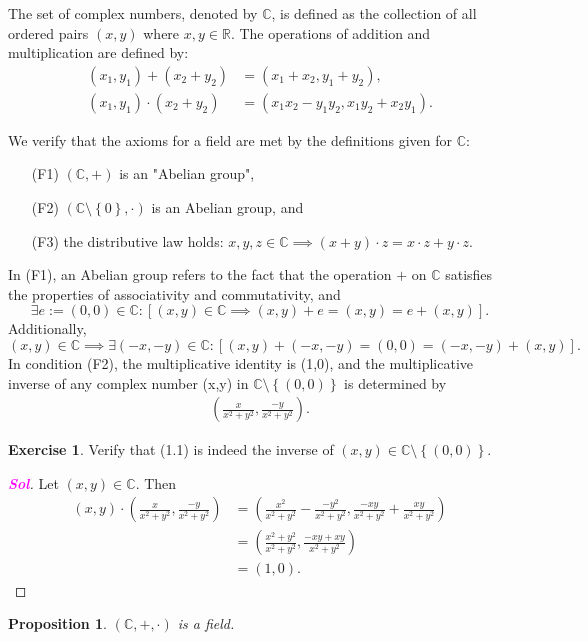 \documentclass[12pt,openany]{book}
\newtheorem{proposition}[theorem]{Proposition}
\theoremstyle{definition}
\newtheorem{exercise}{Exercise}[section]
\newcommand{\set}[1]{\left\{#1\right\}}
\newcommand{\R}{\mathbb{R}}
\newcommand{\C}{\mathbb{C}}
\newcommand{\of}[1]{\left( #1 \right)}
\newcommand{\sol}{\textcolor{magenta}{\bf Sol}}
\begin{document}
	The set of complex numbers, denoted by $\C$, is defined as the collection of all ordered pairs $(x,y)$ where $x,y\in\R$. The operations of addition and multiplication are defined by:\begin{align*}
		(x_1,y_1)+(x_2+y_2)&=(x_1+x_2,y_1+y_2),\\
		(x_1,y_1)\cdot(x_2+y_2)&=(x_1x_2-y_1y_2,x_1y_2+x_2y_1).
	\end{align*}
	
	We verify that the axioms for a field are met by the definitions given for $\C$: \begin{itemize}
		\item[(F1)] $\of{\C,+}$ is an "Abelian group",
		\item[(F2)] $\of{\C\setminus\set{0},\cdot}$ is an Abelian group, and
		\item[(F3)] the distributive law holds: $x,y,z\in\C\implies\of{x+y}\cdot z=x\cdot z+y\cdot z$.
	\end{itemize}
	
	In (F1), an Abelian group refers to the fact that the operation $+$ on $\C$ satisfies the properties of associativity and commutativity, and \[
	\exists e:=(0,0)\in\C:[(x,y)\in\C\implies(x,y)+e=(x,y)=e+(x,y)].
	\] Additionally, \[
	(x,y)\in\C\implies\exists(-x,-y)\in\C:[(x,y)+(-x,-y)=(0,0)=(-x,-y)+(x,y)].
	\] In condition (F2), the multiplicative identity is (1,0), and the multiplicative inverse of any complex number (x,y) in $\C\setminus\set{(0,0)}$ is determined by \begin{align}
		\of{\frac{x}{x^2+y^2},\frac{-y}{x^2+y^2}}.
	\end{align}
	
	\begin{exercise}
		Verify that (1.1) is indeed the inverse of $(x,y)\in\C\setminus\set{(0,0)}$.
		\begin{proof}[\sol]
			Let $(x,y)\in\C$. Then \begin{align*}
				(x,y)\cdot\of{\frac{x}{x^2+y^2},\frac{-y}{x^2+y^2}}
				&=\of{\frac{x^2}{x^2+y^2}-\frac{-y^2}{x^2+y^2},\frac{-xy}{x^2+y^2}+\frac{xy}{x^2+y^2}}\\
				&=\of{\frac{x^2+y^2}{x^2+y^2},\frac{-xy+xy}{x^2+y^2}}\\
				&=(1,0).
			\end{align*}
		\end{proof}
	\end{exercise}
	
	\begin{tcolorbox}[colback=white,colframe=procolor, title={\color{white}\bf Complex Numbers are Field}]
		\begin{proposition}
			$\of{\C,+,\cdot}$ is a field.
		\end{proposition}
	\end{tcolorbox}
	
\end{document}
